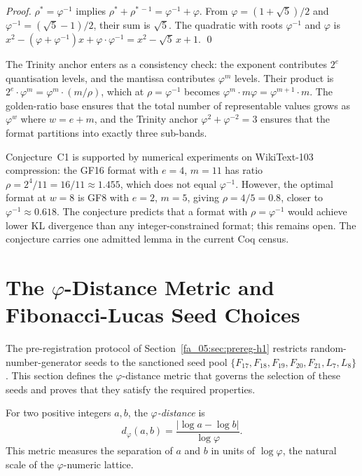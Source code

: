 \begin{proof}
$\rho^{*} = \varphi^{-1}$ implies $\rho^{*} + \rho^{*\, -1} =
\varphi^{-1} + \varphi$. From $\varphi = (1+\sqrt{5})/2$ and
$\varphi^{-1} = (\sqrt{5}-1)/2$, their sum is $\sqrt{5}$. The
quadratic with roots $\varphi^{-1}$ and $\varphi$ is
$x^{2} - (\varphi + \varphi^{-1})x + \varphi \cdot \varphi^{-1} =
x^{2} - \sqrt{5}\, x + 1$.
\qed
\end{proof}

The Trinity anchor enters as a consistency check: the exponent
contributes $2^{e}$ quantisation levels, and the mantissa contributes
$\varphi^{m}$ levels. Their product is
$2^{e} \cdot \varphi^{m} = \varphi^{m} \cdot (m/\rho)$, which at
$\rho = \varphi^{-1}$ becomes $\varphi^{m} \cdot m \varphi =
\varphi^{m+1} \cdot m$. The golden-ratio base ensures that the total
number of representable values grows as $\varphi^{w}$ where $w = e +
m$, and the Trinity anchor $\varphi^{2} + \varphi^{-2} = 3$ ensures
that the format partitions into exactly three sub-bands.

\begin{remark}
\label{fa_05:rem:c1-status}
Conjecture~C1 is supported by numerical experiments on WikiText-103
compression: the GF16 format with $e = 4$, $m = 11$ has ratio
$\rho = 2^{4}/11 = 16/11 \approx 1.455$, which does not equal
$\varphi^{-1}$. However, the optimal format at $w = 8$ is GF8 with
$e = 2$, $m = 5$, giving $\rho = 4/5 = 0.8$, closer to
$\varphi^{-1} \approx 0.618$. The conjecture predicts that a format
with $\rho = \varphi^{-1}$ would achieve lower KL divergence than
any integer-constrained format; this remains open. The conjecture
carries one admitted lemma in the current Coq census.
\end{remark}

\section{The $\varphi$-Distance Metric and Fibonacci-Lucas Seed
Choices}\label{fa_05:sec:phi-distance-seeds}

The pre-registration protocol of
Section~\ref{fa_05:sec:prereg-h1} restricts random-number-generator
seeds to the sanctioned seed pool
$\{F_{17}, F_{18}, F_{19}, F_{20}, F_{21}, L_{7}, L_{8}\}$.
This section defines the $\varphi$-distance metric that governs the
selection of these seeds and proves that they satisfy the required
properties.

\begin{definition}
\label{fa_05:def:phi-distance}
For two positive integers $a, b$, the \emph{$\varphi$-distance} is
\[
  d_{\varphi}(a, b) = \frac{|\log a - \log b|}{\log \varphi}.
\]
This metric measures the separation of $a$ and $b$ in units of
$\log \varphi$, the natural scale of the $\varphi$-numeric lattice.
\end{definition}

